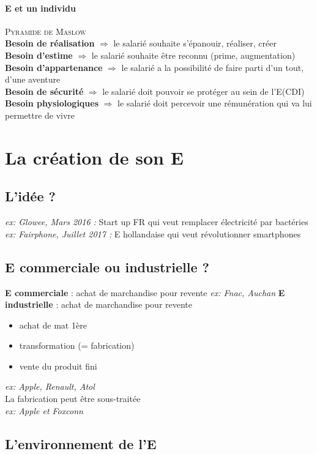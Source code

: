 \documentclass[a4paper,11pt]{report}
\begin{document}
\subsubsection{E et un individu}
\textsc{Pyramide de Maslow}\\
\textbf{Besoin de réalisation} $\Rightarrow$ le salarié souhaite s'épanouir, réaliser, créer\\
\textbf{Besoin d'estime} $\Rightarrow$ le salarié souhaite être reconnu (prime, augmentation)\\
\textbf{Besoin d'appartenance} $\Rightarrow$ le salarié a la possibilité de faire parti d'un tout, d'une aventure\\
\textbf{Besoin de sécurité} $\Rightarrow$ le salarié doit pouvoir se protéger au sein de l'E(CDI)\\
\textbf{Besoin physiologiques} $\Rightarrow$ le salarié doit percevoir une rémunération qui va lui permettre de vivre\\

\chapter{La création de son E}
\section{L'idée ?}
\textit{ex: Glowee, Mars 2016 :} Start up FR qui veut remplacer électricité par bactéries\\
\textit{ex: Fairphone, Juillet 2017 :} E hollandaise qui veut révolutionner smartphones
\section{E commerciale ou industrielle ?}
\textbf{E commerciale} : achat de marchandise pour revente \textit{ex: Fnac, Auchan}
\textbf{E industrielle} : achat de marchandise pour revente 
\begin{itemize}
    \item achat de mat 1ère
    \item transformation (= fabrication)
    \item vente du produit fini
\end{itemize} 
\textit{ex: Apple, Renault, Atol} \\
La fabrication peut être sous-traitée \\
\textit{ex: Apple et Foxconn}
\section{L'environnement de l'E}
\end{document}
